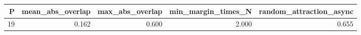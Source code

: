 \begin{tabular}{rrrrr}
\toprule
P & mean\_abs\_overlap & max\_abs\_overlap & min\_margin\_times\_N & random\_attraction\_async \\
\midrule
19 & 0.162 & 0.600 & 2.000 & 0.655 \\
\bottomrule
\end{tabular}
